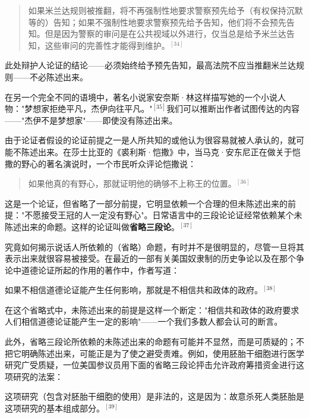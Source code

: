 \begin{quotation}
如果米兰达规则被推翻，将不再强制性地要求警察预先给予（有权保持沉默等的）告知；如果不强制性地要求警察预先给予告知，他们将不会预先告知。但是因为警察的审问是在公共视域以外进行，仅当总是给予米兰达告知，这些审问的完善性才能得到维护。${}^{[34]}$
\end{quotation}

此处辩护人论证的结论——必须始终给予预先告知，最高法院不应当推翻米兰达规则——不必陈述出来。

在另一个完全不同的语境中，著名小说家安奈斯·林这样描写她的一个小说人物："梦想家拒绝平凡，杰伊向往平凡。"${}^{[35]}$我们可以推断出作者试图传达的内容——"杰伊不是梦想家"——即使没有陈述出来。

由于论证者假设的论证前提之一是人所共知的或他认为很容易就被人承认的，就可能不陈述出来。在莎士比亚的《裘利斯·恺撒》中，当马克·安东尼正在做关于恺撒的野心的著名演说时，一个市民听众评论恺撒说：

\begin{quotation}
如果他真的有野心，那就证明他的确够不上称王的位置。${}^{[36]}$
\end{quotation}

这是一个论证，但省略了一部分前提，它明显依赖一个合理的但未陈述出来的前提："不愿接受王冠的人一定没有野心"。日常语言中的三段论论证经常依赖某个未陈述出来的命题。这样的论证叫做\textbf{省略三段论}。${}^{[37]}$

究竟如何揭示说话人所依赖的（省略）命题，有时并不是很明显的，尽管一旦将其表示出来就很容易被接受。在最近的一部有关美国奴隶制的历史争论以及在那个争论中道德论证所起的作用的著作中，作者写道：

\begin{displayquote}
如果不相信道德论证能产生任何影响，那就是不相信共和政体的政府。${}^{[38]}$
\end{displayquote}

在这个省略式中，未陈述出来的前提是这样一个断定："相信共和政体的政府要求人们相信道德论证能产生一定的影响"——一个我们多数人都会认可的断言。

此外，省略三段论所依赖的未陈述出来的命题有可能并不显然，而是可质疑的；不把它明确陈述出来，可能正是为了使之避受责难。例如，使用胚胎干细胞进行医学研究广受质疑，一位美国参议员用下面的省略三段论抨击允许政府筹措资金进行这项研究的法案：

\begin{displayquote}
这项研究（包含对胚胎干细胞的使用）是非法的，这是因为：故意杀死人类胚胎是这项研究的基本组成部分。${}^{[39]}$
\end{displayquote}

